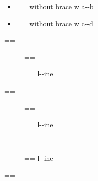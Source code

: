 \documentclass{book}
\makeatletter
\newenvironment{GNUTexinfopreformatted}{%
  \par\GNUTobeylines\obeyspaces\frenchspacing
  \parskip=\z@\parindent=\z@}{}
{\catcode`\^^M=13 \gdef\GNUTobeylines{\catcode`\^^M=13 \def^^M{\null\par}}}
\newenvironment{GNUTexinfoindented}
  {\begin{list}{}{}
  \item\relax}
  {\end{list}}
\makeatother
\begin{document}
\begin{GNUTexinfoindented}
\begin{itemize}[label={}]
\item \begin{GNUTexinfopreformatted}%
\ttfamily without brace w a{-}{-}b
\end{GNUTexinfopreformatted}
\item \begin{GNUTexinfopreformatted}%
\ttfamily without brace w c{-}{-}d
\end{GNUTexinfopreformatted}
\end{itemize}
\begin{GNUTexinfopreformatted}%
\ttfamily 
\end{GNUTexinfopreformatted}
\begin{description}
\item[] \begin{GNUTexinfopreformatted}%
\ttfamily \end{GNUTexinfopreformatted}
\item[{\parbox[b]{\linewidth}{%
a}}]
\begin{GNUTexinfopreformatted}%
\ttfamily l{-}{-}ine
\end{GNUTexinfopreformatted}
\end{description}
\begin{GNUTexinfopreformatted}%
\ttfamily 
\end{GNUTexinfopreformatted}
\begin{description}
\item[] \begin{GNUTexinfopreformatted}%
\ttfamily \end{GNUTexinfopreformatted}
\item[{\parbox[b]{\linewidth}{%
a--missing style formatting}}]
\begin{GNUTexinfopreformatted}%
\ttfamily l{-}{-}ine
\end{GNUTexinfopreformatted}
\end{description}
\begin{GNUTexinfopreformatted}%
\ttfamily 
\end{GNUTexinfopreformatted}
\begin{description}
\item[{\parbox[b]{\linewidth}{%
a\\
\index[fn]{a@\texttt{a}}%
\index[cp]{index entry between item and itemx}%
b
\index[fn]{b@\texttt{b}}%
}}]
\begin{GNUTexinfopreformatted}%
\ttfamily l{-}{-}ine
\end{GNUTexinfopreformatted}
\end{description}
\begin{GNUTexinfopreformatted}%
\ttfamily 
\end{GNUTexinfopreformatted}


\end{GNUTexinfoindented}
\end{document}
